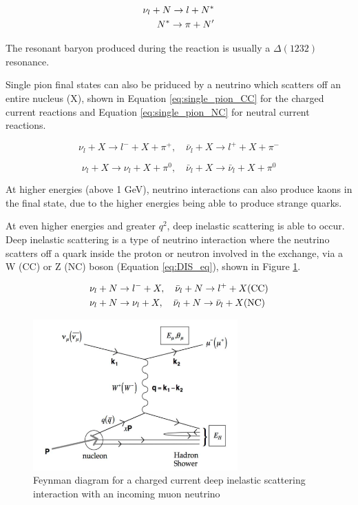 \begin{align}
\nu_{l}+N \rightarrow l+N^{*}\label{eq:resonant_pion} \\
N^{*} \rightarrow \pi+N^{\prime} \notag
\end{align}


The resonant baryon produced during the reaction is usually a $\Delta(1232)$ resonance. 

Single pion final states can also be priduced by a neutrino which scatters off an entire nucleus (X), shown in Equation \ref{eq:single_pion_CC} for the charged current reactions and Equation \ref{eq:single_pion_NC} for neutral current reactions. 

\begin{equation}
\nu_{l}+X \rightarrow l^{-}+X+\pi^{+}, \quad \bar{\nu}_{l}+X \rightarrow l^{+}+X+\pi^{-}
\label{eq:single_pion_CC}
\end{equation}

\begin{equation}
\nu_{l}+X \rightarrow \nu_{l}+X+\pi^{0}, \quad \bar{\nu}_{l}+X \rightarrow \bar{\nu}_{l}+X+\pi^{0}
\label{eq:single_pion_NC}
\end{equation}

At higher energies (above 1 GeV), neutrino interactions can also produce kaons in the final state, due to the higher energies being able to produce strange quarks. 

At even higher energies and greater $q^2$, deep inelastic scattering is able to occur. Deep inelastic scattering is a type of neutrino interaction where the neutrino scatters off a quark inside the proton or neutron involved in the exchange, via a W (CC) or Z (NC) boson (Equation \ref{eq:DIS_eq}), shown in Figure \ref{fig:CC_DIS}.


\begin{align}
&\nu_{l}+N \rightarrow l^{-}+X, \quad \bar{\nu}_{l}+N \rightarrow l^{+}+X(\mathrm{CC}) \label{eq:DIS_eq}\\
&\nu_{l}+N \rightarrow \nu_{l}+X, \quad \bar{\nu}_{l}+N \rightarrow \bar{\nu}_{l}+X(\mathrm{NC}) \notag
\end{align}


\begin{figure}
    \centering
    \includegraphics[width=0.7\textwidth]{Figures/CC_DIS.png}
    \caption{Feynman diagram for a charged current deep inelastic scattering interaction with an incoming muon neutrino}
    \label{fig:CC_DIS}
\end{figure}

